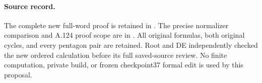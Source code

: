 \paragraph{Source record.}
The complete new full-word proof is retained in
.
The precise normalizer comparison and A.124 proof scope are in
.
All original formulas, both original cycles, and every pentagon
pair are retained. Root and DE independently checked the new
ordered calculation before its full saved-source review. No
finite computation, private build, or frozen checkpoint37
formal edit is used by this proposal.
